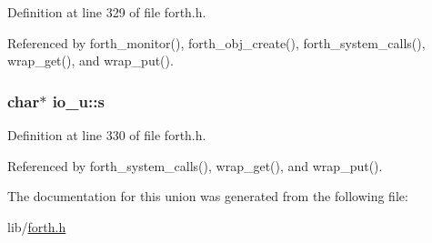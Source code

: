 Definition at line 329 of file forth.\-h.



Referenced by forth\-\_\-monitor(), forth\-\_\-obj\-\_\-create(), forth\-\_\-system\-\_\-calls(), wrap\-\_\-get(), and wrap\-\_\-put().

\hypertarget{unionio__u_af2ba735a875960b4c28a64b204f8951d}{
\subsubsection[{s}]{\setlength{\rightskip}{0pt plus 5cm}char$\ast$ io\-\_\-u\-::s}}\label{unionio__u_af2ba735a875960b4c28a64b204f8951d}


Definition at line 330 of file forth.\-h.



Referenced by forth\-\_\-system\-\_\-calls(), wrap\-\_\-get(), and wrap\-\_\-put().



The documentation for this union was generated from the following file\-:\begin{DoxyCompactItemize}
\item 
lib/\hyperlink{forth_8h}{forth.\-h}\end{DoxyCompactItemize}
